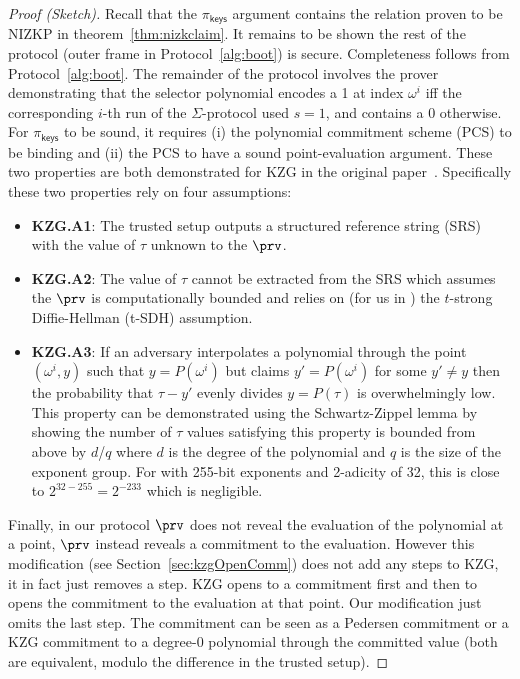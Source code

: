 \begin{proof}[Proof (Sketch)] Recall that the $\pi_\mathsf{keys}$ argument contains the relation proven to be NIZKP in theorem~\ref{thm:nizkclaim}. It remains to be shown the rest of the protocol (outer frame in Protocol~\ref{alg:boot}) is secure. Completeness follows from Protocol~\ref{alg:boot}. The remainder of the protocol involves the prover demonstrating that the selector polynomial encodes a 1 at index $\omega^i$ iff the corresponding $i$-th run of the $\Sigma$-protocol used $s=1$, and contains a 0 otherwise. For $\pi_\mathsf{keys}$ to be sound, it requires (i) the polynomial commitment scheme (PCS) to be binding and (ii) the PCS to have a sound point-evaluation argument. These two properties are both demonstrated for KZG in the original paper~\cite{kzg}. Specifically these two properties rely on four assumptions:

\begin{itemize}
\item \textbf{KZG.A1}: The trusted setup outputs a structured reference string (SRS) with the value of $\tau$ unknown to the $\prv$. 
\item \textbf{KZG.A2}: The value of $\tau$ cannot be extracted from the SRS which assumes the $\prv$ is computationally bounded and relies on (for us in \bls) the $t$-strong Diffie-Hellman (t-SDH) assumption.
\item \textbf{KZG.A3}: If an adversary interpolates a polynomial through the point $(\omega^i,y)$ such that $y=P(\omega^i)$ but claims $y'=P(\omega^i)$ for some $y'\neq y$ then the probability that $\tau-y'$ evenly divides $y=P(\tau)$ is overwhelmingly low. This property can be demonstrated using the Schwartz-Zippel lemma by showing the number of $\tau$ values satisfying this property is bounded from above by $d$/$q$ where $d$ is the degree of the polynomial and $q$ is the size of the exponent group. For \bls with 255-bit exponents and 2-adicity of 32, this is close to $2^{32-255}=2^{-233}$ which is negligible.
\end{itemize}

Finally, in our protocol $\prv$ does not reveal the evaluation of the polynomial at a point, $\prv$ instead reveals a commitment to the evaluation. However this modification (see Section~\ref{sec:kzgOpenComm}) does not add any steps to KZG, it in fact just removes a step. KZG opens to a commitment first and then to opens the commitment to the evaluation at that point. Our modification just omits the last step. The commitment can be seen as a Pedersen commitment or a KZG commitment to a degree-0 polynomial through the committed value (both are equivalent, modulo the difference in the trusted setup). 


\end{proof}
